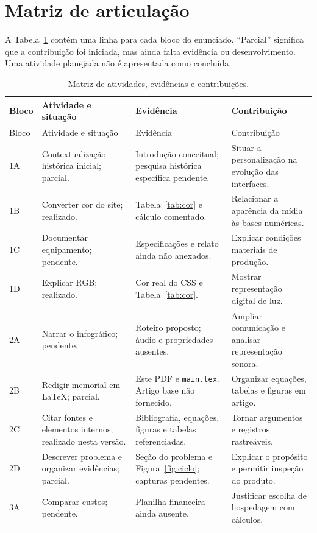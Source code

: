 \documentclass[12pt,a4paper]{article}
\begin{document}
\section{Matriz de articulação}\label{sec:matriz}
A Tabela~\ref{tab:matriz} contém uma linha para cada bloco do enunciado. ``Parcial'' significa que a contribuição foi iniciada, mas ainda falta evidência ou desenvolvimento. Uma atividade planejada não é apresentada como concluída.
\small
\begin{longtable}{p{}p{}p{}p{}}
\caption{Matriz de atividades, evidências e contribuições.}\label{tab:matriz}\\
\toprule Bloco & Atividade e situação & Evidência & Contribuição\\\midrule\endfirsthead
\toprule Bloco & Atividade e situação & Evidência & Contribuição\\\midrule\endhead
1A & Contextualização histórica inicial; parcial. & Introdução conceitual; pesquisa histórica específica pendente. & Situar a personalização na evolução das interfaces.\\
1B & Converter cor do site; realizado. & Tabela~\ref{tab:cor} e cálculo comentado. & Relacionar a aparência da mídia às bases numéricas.\\
1C & Documentar equipamento; pendente. & Especificações e relato ainda não anexados. & Explicar condições materiais de produção.\\
1D & Explicar RGB; realizado. & Cor real do CSS e Tabela~\ref{tab:cor}. & Mostrar representação digital de luz.\\
2A & Narrar o infográfico; pendente. & Roteiro proposto; áudio e propriedades ausentes. & Ampliar comunicação e analisar representação sonora.\\
2B & Redigir memorial em LaTeX; parcial. & Este PDF e \texttt{main.tex}. Artigo base não fornecido. & Organizar equações, tabelas e figuras em artigo.\\
2C & Citar fontes e elementos internos; realizado nesta versão. & Bibliografia, equações, figuras e tabelas referenciadas. & Tornar argumentos e registros rastreáveis.\\
2D & Descrever problema e organizar evidências; parcial. & Seção do problema e Figura~\ref{fig:ciclo}; capturas pendentes. & Explicar o propósito e permitir inspeção do produto.\\
3A & Comparar custos; pendente. & Planilha financeira ainda ausente. & Justificar escolha de hospedagem com cálculos.\\

\end{longtable}
\end{document}
